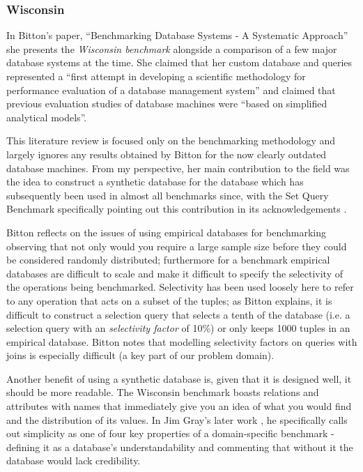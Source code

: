 \subsubsection{Wisconsin}
In Bitton's paper, ``Benchmarking Database Systems - A Systematic Approach''
\cite{Wisconsin} she presents the \emph{Wisconsin benchmark} alongside a
comparison of a few major database systems at the time. She claimed that her
custom database and queries represented a ``first attempt in developing a
scientific methodology for performance evaluation of a database management
system'' and claimed that previous evaluation studies of database machines were
``based on simplified analytical models''.

This literature review is focused only on the benchmarking methodology and
largely ignores any results obtained by Bitton for the now clearly outdated
database machines. From my perspective, her main contribution to the field was
the idea to construct a synthetic database for the database which has
subsequently been used in almost all benchmarks since, with the Set Query
Benchmark specifically pointing out this contribution in its acknowledgements
\cite{SetQueryBenchmark}. 

Bitton reflects on the issues of using empirical
databases for benchmarking observing that not only would you require a large
sample size before they could be considered randomly distributed; furthermore
for a benchmark empirical databases are difficult to scale and make it difficult
to specify the selectivity of the operations being benchmarked. Selectivity has
been used loosely here to refer to any operation that acts on a subset of
the tuples; as Bitton explains, it is difficult to construct a selection query that
selects a tenth of the database (i.e. a selection query with an \emph{selectivity
factor} of 10\%) or only keeps 1000 tuples in an empirical database. Bitton
notes that modelling selectivity factors on queries with joins is especially
difficult (a key part of our problem domain). 

Another benefit of using a synthetic database is, given that it is designed
well, it should be more readable. The Wisconsin benchmark boasts relations and
attributes with names that immediately give you an idea of what you would find
and the distribution of its values. In Jim Gray's later work
\cite{BenchmarkHandbook}, he specifically calls out simplicity as one of four
key properties of a domain-specific benchmark - defining it as a database's
understandability and commenting that without it the database would lack
credibility.

